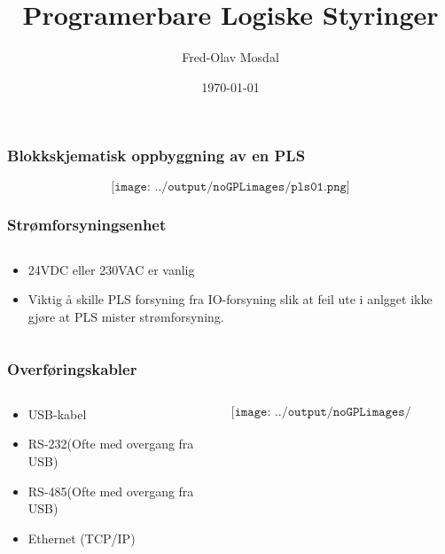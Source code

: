 \documentclass[aspectratio=169,xcolor=dvipsnames]{beamer}
\title[PLS]{Programerbare Logiske Styringer} %
\author[Fred-Olav] {Fred-Olav Mosdal}
\institute[Gand VGS] %
{
    Gand VGS \\
    VG3 Automasjon }
\date{\today} %
\begin{document}
\begin{frame}
\titlepage
\end{frame}






\begin{frame}
	\frametitle{Blokkskjematisk oppbyggning av en PLS}
	$$\texttt{[image: ../output/noGPLimages/pls01.png]}$$
\end{frame}
\begin{frame}
	\frametitle{Strømforsyningsenhet}
	\begin{columns}
		\begin{column}{0.5\textwidth}
			\begin{itemize}
				\item 24VDC eller 230VAC er vanlig
				\item Viktig å skille PLS forsyning fra IO-forsyning slik at feil ute i anlgget ikke gjøre at PLS mister strømforsyning. 
			\end{itemize}

			
		\end{column}

		\begin{column}{0.5\textwidth}
		\end{column}
	\end{columns}
\end{frame}

\begin{frame}
	\frametitle{Overføringskabler}
	\begin{columns}
		\begin{column}{0.5\textwidth}
			\begin{itemize}
				\item USB-kabel
				\item RS-232(Ofte med overgang fra USB)
				\item RS-485(Ofte med overgang fra USB)
				\item Ethernet (TCP/IP)
			\end{itemize}

			
		\end{column}

		\begin{column}{0.5\textwidth}
	$$\texttt{[image: ../output/noGPLimages/pls02.png]}$$
		\end{column}
	\end{columns}
\end{frame}
\end{document}
